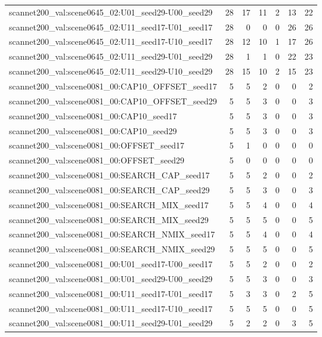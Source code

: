 \begin{table}[t]
\begin{tabular}{lrrrrrr}
scannet200\_val:scene0645\_02:U01\_seed29-U00\_seed29 & 28 & 17 & 11 & 2 & 13 & 22 \\
scannet200\_val:scene0645\_02:U11\_seed17-U01\_seed17 & 28 & 0 & 0 & 0 & 26 & 26 \\
scannet200\_val:scene0645\_02:U11\_seed17-U10\_seed17 & 28 & 12 & 10 & 1 & 17 & 26 \\
scannet200\_val:scene0645\_02:U11\_seed29-U01\_seed29 & 28 & 1 & 1 & 0 & 22 & 23 \\
scannet200\_val:scene0645\_02:U11\_seed29-U10\_seed29 & 28 & 15 & 10 & 2 & 15 & 23 \\
scannet200\_val:scene0081\_00:CAP10\_OFFSET\_seed17 & 5 & 5 & 2 & 0 & 0 & 2 \\
scannet200\_val:scene0081\_00:CAP10\_OFFSET\_seed29 & 5 & 5 & 3 & 0 & 0 & 3 \\
scannet200\_val:scene0081\_00:CAP10\_seed17 & 5 & 5 & 3 & 0 & 0 & 3 \\
scannet200\_val:scene0081\_00:CAP10\_seed29 & 5 & 5 & 3 & 0 & 0 & 3 \\
scannet200\_val:scene0081\_00:OFFSET\_seed17 & 5 & 1 & 0 & 0 & 0 & 0 \\
scannet200\_val:scene0081\_00:OFFSET\_seed29 & 5 & 0 & 0 & 0 & 0 & 0 \\
scannet200\_val:scene0081\_00:SEARCH\_CAP\_seed17 & 5 & 5 & 2 & 0 & 0 & 2 \\
scannet200\_val:scene0081\_00:SEARCH\_CAP\_seed29 & 5 & 5 & 3 & 0 & 0 & 3 \\
scannet200\_val:scene0081\_00:SEARCH\_MIX\_seed17 & 5 & 5 & 4 & 0 & 0 & 4 \\
scannet200\_val:scene0081\_00:SEARCH\_MIX\_seed29 & 5 & 5 & 5 & 0 & 0 & 5 \\
scannet200\_val:scene0081\_00:SEARCH\_NMIX\_seed17 & 5 & 5 & 4 & 0 & 0 & 4 \\
scannet200\_val:scene0081\_00:SEARCH\_NMIX\_seed29 & 5 & 5 & 5 & 0 & 0 & 5 \\
scannet200\_val:scene0081\_00:U01\_seed17-U00\_seed17 & 5 & 5 & 2 & 0 & 0 & 2 \\
scannet200\_val:scene0081\_00:U01\_seed29-U00\_seed29 & 5 & 5 & 3 & 0 & 0 & 3 \\
scannet200\_val:scene0081\_00:U11\_seed17-U01\_seed17 & 5 & 3 & 3 & 0 & 2 & 5 \\
scannet200\_val:scene0081\_00:U11\_seed17-U10\_seed17 & 5 & 5 & 5 & 0 & 0 & 5 \\
scannet200\_val:scene0081\_00:U11\_seed29-U01\_seed29 & 5 & 2 & 2 & 0 & 3 & 5 \\

\end{tabular}
\end{table}
